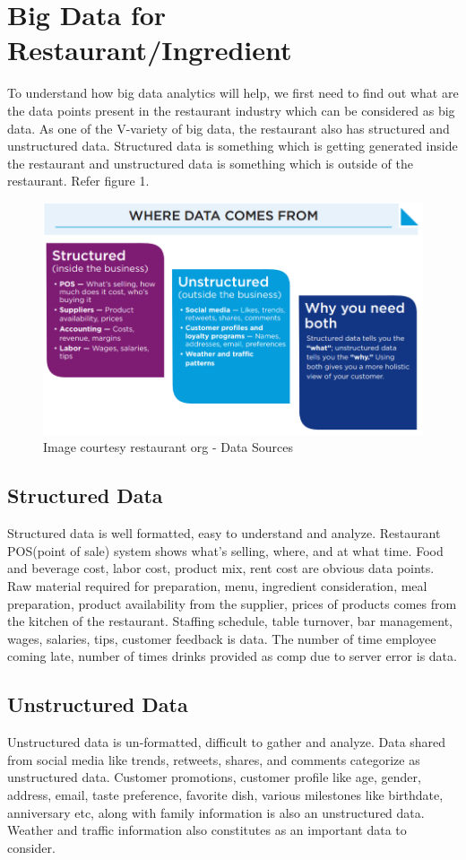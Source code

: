 \documentclass[sigconf]{acmart}
\begin{document}
\section{Big Data for Restaurant/Ingredient}
To understand how big data analytics will help, we first need to find out what are the data points present in the restaurant industry which can be considered as big data. As one of the V-variety of big data, the restaurant also has structured and unstructured data. Structured data is something which is getting generated inside the restaurant and unstructured data is something which is outside of the restaurant. Refer figure 1.
\begin{figure}
\includegraphics{images/datasource}
\caption{Image courtesy restaurant org - Data Sources}
\end{figure}

\subsection{Structured Data}
Structured data is well formatted, easy to understand and analyze. Restaurant POS(point of sale) system shows what's selling, where, and at what time\cite{www-qsr}. Food and beverage cost, labor cost, product mix, rent cost are obvious data points. Raw material required for preparation, menu, ingredient consideration, meal preparation, product availability from the supplier, prices of products comes from the kitchen of the restaurant. Staffing schedule, table turnover, bar management, wages, salaries, tips, customer feedback is data. The number of time employee coming late, number of times drinks provided as comp due to server error is data.\cite{www-restaurant}
\subsection{Unstructured Data}
Unstructured data is un-formatted, difficult to gather and analyze. Data shared from social media like trends, retweets, shares, and comments categorize as unstructured data. Customer promotions, customer profile like age, gender, address, email, taste preference, favorite dish, various milestones like birthdate, anniversary etc, along with family information is also an unstructured data. Weather and traffic information also constitutes as an important data to consider. \cite{www-restaurant}
\end{document}
